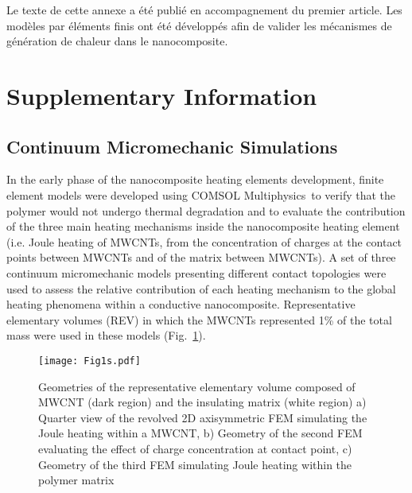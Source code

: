 \label{sec:Annexe_B}

Le texte de cette annexe a été publié en accompagnement du premier article. 
Les modèles par éléments finis ont été développés afin de valider les mécanismes de génération de chaleur dans le nanocomposite. 

\section*{Supplementary Information}

\subsection*{Continuum Micromechanic Simulations}

In the early phase of the nanocomposite heating elements development, finite element models were developed using COMSOL Mul\-ti\-phy\-sics\-\textregistered \ to verify that the polymer would not undergo thermal degradation and to evaluate the contribution of the three main heating mechanisms inside the nanocomposite heating element (i.e. Joule heating of MWCNTs, from the concentration of charges at the contact points between MWCNTs and of the matrix between MWCNTs).  
A set of three continuum micromechanic models presenting different contact topologies were used to assess the relative contribution of each heating mechanism to the global heating phenomena within a conductive nanocomposite. 
Representative elementary volumes (REV) in which the MWCNTs represented 1\% of the total mass were used in these models (Fig.~\ref{fig:geometry}). 

\begin{figure}[htb]
	\centering
	\texttt{[image: Fig1s.pdf]}
	\caption{Geometries of the representative elementary volume composed of MWCNT (dark region) and the insulating matrix (white region) a) Quarter view of the revolved 2D axisymmetric FEM simulating the Joule heating within a MWCNT, b) Geometry of the second FEM evaluating the effect of charge concentration at contact point, c) Geometry of the third FEM simulating Joule heating within the polymer matrix \cite{Brassard2018_figshare_article1}}
	\label{fig:geometry}
\end{figure}

